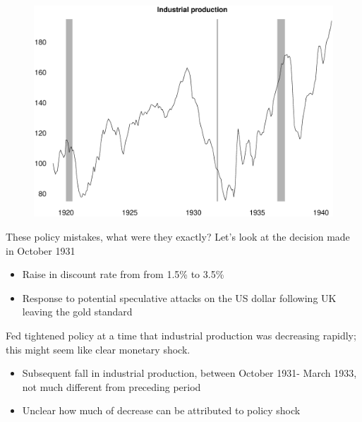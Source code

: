 \documentclass{beamer}
\begin{document}
\begin{frame}
  \begin{figure}
    \includegraphics[scale=.3]{industrial_production.eps}
  \end{figure}
\end{frame}

\begin{frame}
 These policy mistakes, what were they exactly?
 Let's look at the decision made in October 1931
 \medskip
  \begin{itemize}
    \item Raise in discount rate from from 1.5\% to 3.5\%
    \item Response to potential speculative attacks on the US dollar following UK leaving the gold standard
  \end{itemize}  
\end{frame}

\begin{frame}
Fed tightened policy at a time that industrial production was decreasing rapidly; this might seem like clear monetary shock.
\medskip  
  \begin{itemize}
    \item Subsequent fall in industrial production, between October 1931- March 1933, not much different from preceding period
    \item Unclear how much of decrease can be attributed to policy shock
  \end{itemize}  
\end{frame}
\end{document}
